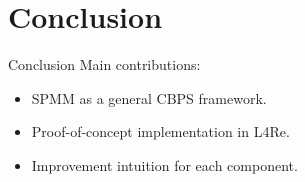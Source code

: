 \section{Conclusion}
\label{sec:conclusion}

\begin{frame}{Conclusion}
  Main contributions:
  \begin{itemize}
    \item<2-> SPMM as a general CBPS framework.
    \item<3-> Proof-of-concept implementation in L4Re.
    \item<4-> Improvement intuition for each component.
  \end{itemize}
\end{frame}
